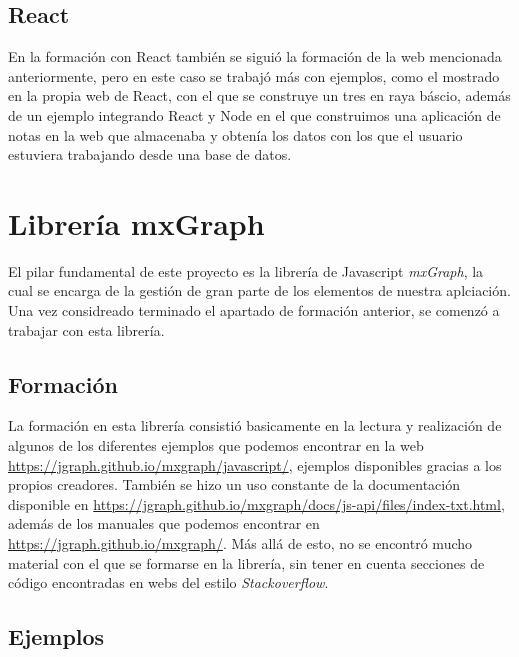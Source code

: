 \subsection{React}

En la formación con React también se siguió la formación de la web mencionada anteriormente, pero en este caso se trabajó más con ejemplos, como el mostrado en la propia web de React, con el que se construye un tres en raya báscio, además de un ejemplo integrando React y Node en el que construimos una aplicación de notas en la web que almacenaba y obtenía los datos con los que el usuario estuviera trabajando desde una base de datos.

\section{Librería mxGraph}

El pilar fundamental de este proyecto es la librería de Javascript \emph{mxGraph}, la cual se encarga de la gestión de gran parte de los elementos de nuestra aplciación. Una vez considreado terminado el apartado de formación anterior, se comenzó a trabajar con esta librería.

\subsection{Formación}

La formación en esta librería consistió basicamente en la lectura y realización de algunos de los diferentes ejemplos que podemos encontrar en la web \url{https://jgraph.github.io/mxgraph/javascript/}, ejemplos disponibles gracias a los propios creadores. También se hizo un uso constante de la documentación disponible en \url{https://jgraph.github.io/mxgraph/docs/js-api/files/index-txt.html}, además de los manuales que podemos encontrar en \url{https://jgraph.github.io/mxgraph/}. Más allá de esto, no se encontró mucho material con el que se formarse en la librería, sin tener en cuenta secciones de código encontradas en webs del estilo \textit{Stackoverflow}.

\subsection{Ejemplos}

